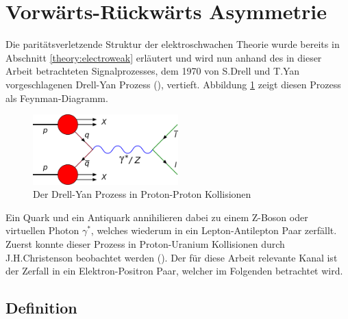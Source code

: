 \section{Vorwärts-Rückwärts Asymmetrie}
\label{theory:afb}


Die paritätsverletzende Struktur der elektroschwachen Theorie wurde bereits in
Abschnitt \ref{theory:electroweak} erläutert und wird nun anhand des in dieser
Arbeit betrachteten Signalprozesses, dem 1970 von S.Drell und T.Yan
vorgeschlagenen Drell-Yan Prozess (\cite{PhysRevLett.25.316}), vertieft.
Abbildung \ref{fig:drell_yan} zeigt diesen Prozess als Feynman-Diagramm.

\pagebreak

\begin{figure}[h]
    \centering
    \includegraphics[width=0.5\textwidth]{img/drell_yan}
    \caption{Der Drell-Yan Prozess in Proton-Proton Kollisionen}
    \label{fig:drell_yan}
\end{figure}

Ein Quark und ein Antiquark annihilieren dabei zu einem Z-Boson oder virtuellen
Photon $\gamma^*$, welches wiederum in ein Lepton-Antilepton Paar zerfällt.
Zuerst konnte dieser Prozess in Proton-Uranium Kollisionen durch
J.H.Christenson beobachtet werden (\cite{PhysRevLett.25.1523}). Der für diese
Arbeit relevante Kanal ist der Zerfall in ein Elektron-Positron Paar, welcher
im Folgenden betrachtet wird.



\subsection{Definition}
\label{theory:afb_definition}

